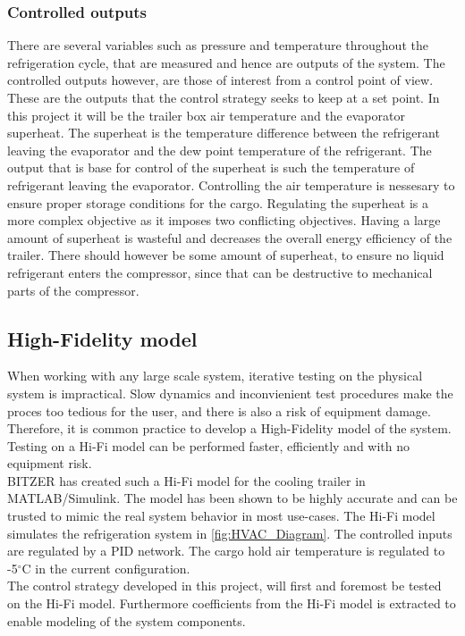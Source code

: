 \subsubsection{Controlled outputs}
There are several variables such as pressure and temperature throughout the refrigeration cycle, that are measured and hence are outputs of the system. The controlled outputs however, are those of interest from a control point of view. These are the outputs that the control strategy seeks to keep at a set point. In this project it will be the trailer box air temperature and the evaporator superheat. The superheat is the temperature difference between the refrigerant leaving the evaporator and the dew point temperature of the refrigerant. The output that is base for control of the superheat is such the temperature of refrigerant leaving the evaporator.
Controlling the air temperature is nessesary to ensure proper storage conditions for the cargo. Regulating the superheat is a more complex objective as it imposes two conflicting objectives. Having a large amount of superheat is wasteful and decreases the overall energy efficiency of the trailer. There should however be some amount of superheat, to ensure no liquid refrigerant enters the compressor, since that can be destructive to mechanical parts of the compressor.

\subsection{High-Fidelity model}
When working with any large scale system, iterative testing on the physical system is impractical. Slow dynamics and inconvienient test procedures make the proces too tedious for the user, and there is also a risk of equipment damage. Therefore, it is common practice to develop a High-Fidelity model of the system. Testing on a Hi-Fi model can be performed faster, efficiently and with no equipment risk. \\

BITZER has created such a Hi-Fi model for the cooling trailer in MATLAB/Simulink. The model has been shown to be highly accurate and can be trusted to mimic the real system behavior in most use-cases. The Hi-Fi model simulates the refrigeration system in \cref{fig:HVAC_Diagram}. The controlled inputs are regulated by a PID network. The cargo hold air temperature is regulated to -5$^{\circ}$C in the current configuration.\\

The control strategy developed in this project, will first and foremost be tested on the Hi-Fi model. Furthermore coefficients from the Hi-Fi model is extracted to enable modeling of the system components.


